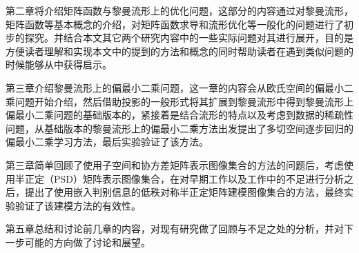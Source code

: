 第二章将介绍矩阵函数与黎曼流形上的优化问题，这部分的内容通过对黎曼流形，矩阵函数等基本概念的介绍，对矩阵函数求导和流形优化等一般化的问题进行了初步的探究。并结合本文其它两个研究内容中的一些实际问题对其进行展开，目的是方便读者理解和实现本文中的提到的方法和概念的同时帮助读者在遇到类似问题的时候能够从中获得启示。

第三章介绍黎曼流形上的偏最小二乘问题，这一章的内容会从欧氏空间的偏最小二乘问题开始介绍，然后借助投影的一般形式将其扩展到黎曼流形中得到黎曼流形上偏最小二乘问题的基础版本的，紧接着是结合流形的特点以及考虑到数据的稀疏性问题，从基础版本的黎曼流形上的偏最小二乘方法出发提出了多切空间逐步回归的偏最小二乘学习方法，最后实验验证了该方法。

第三章简单回顾了使用子空间和协方差矩阵表示图像集合的方法的问题后，考虑使用半正定（PSD）矩阵表示图像集合，在对早期工作以及工作\cite{PSD_WACV}中的不足进行分析之后，提出了使用嵌入判别信息的低秩对称半正定矩阵建模图像集合的方法，最终实验验证了该建模方法的有效性。

第五章总结和讨论前几章的内容，对现有研究做了回顾与不足之处的分析，并对下一步可能的方向做了讨论和展望。